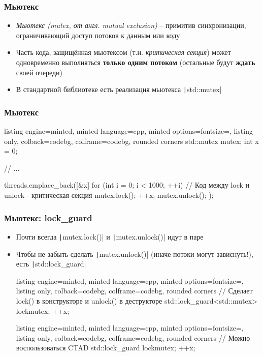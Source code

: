 \documentclass[10pt]{beamer}
\begin{document}
\begin{frame}[fragile]
\frametitle{Мьютекс}
\begin{itemize}
\item \textit{Мьютекс (mutex, от англ. mutual exclusion)} -- примитив синхронизации, ограничивающий доступ потоков к данным или коду
\pause
\item Часть кода, защищённая мьютексом (т.н. \textit{критическая секция}) может одновременно выполняться \textbf{только одним потоком} (остальные будут \textbf{ждать} своей очереди)
\pause
\item В стандартной библиотеке есть реализация мьютекса \texttt|std::mutex|
\end{itemize}
\end{frame}

\begin{frame}[fragile]
\frametitle{Мьютекс}
\begin{itemize}
\begin{tcblisting}{listing engine=minted, minted language=cpp, minted options={fontsize=\scriptsize}, listing only, colback=codebg, colframe=codebg, rounded corners}
std::mutex mutex;
int x = 0;

// ...

threads.emplace_back([&x]{
  for (int i = 0; i < 1000; ++i) {
    // Код между lock и unlock - критическая секция
    mutex.lock();
    ++x;
    mutex.unlock();
  }
});
\end{tcblisting}
\end{itemize}
\end{frame}

\begin{frame}[fragile]
\frametitle{Мьютекс: lock\_guard}
\begin{itemize}
\item Почти всегда \texttt|mutex.lock()| и \texttt|mutex.unlock()| идут в паре
\pause
\item Чтобы не забыть сделать \texttt|mutex.unlock()| (иначе потоки могут зависнуть!), есть \texttt|std::lock_guard|
\begin{tcblisting}{listing engine=minted, minted language=cpp, minted options={fontsize=\scriptsize}, listing only, colback=codebg, colframe=codebg, rounded corners}
// Сделает lock() в конструкторе и unlock() в деструкторе
std::lock_guard<std::mutex> lock{mutex};
++x;
\end{tcblisting}
\pause
\begin{tcblisting}{listing engine=minted, minted language=cpp, minted options={fontsize=\scriptsize}, listing only, colback=codebg, colframe=codebg, rounded corners}
// Можно воспользоваться CTAD
std::lock_guard lock{mutex};
++x;
\end{tcblisting}
\end{itemize}
\end{frame}
\end{document}
